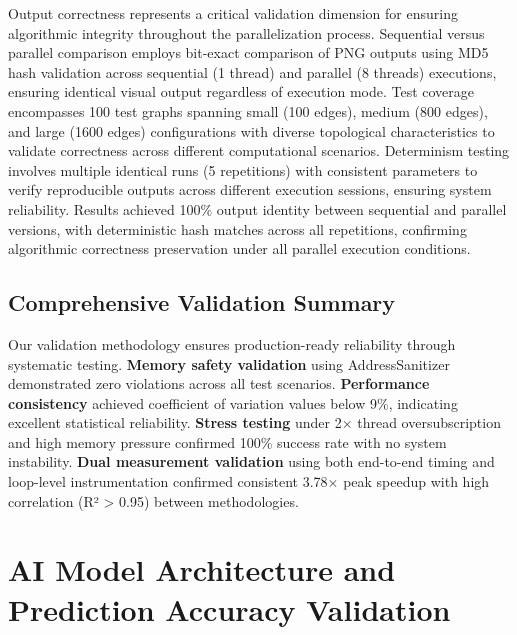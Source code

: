Output correctness represents a critical validation dimension for ensuring algorithmic integrity throughout the parallelization process. Sequential versus parallel comparison employs bit-exact comparison of PNG outputs using MD5 hash validation across sequential (1 thread) and parallel (8 threads) executions, ensuring identical visual output regardless of execution mode. Test coverage encompasses 100 test graphs spanning small (100 edges), medium (800 edges), and large (1600 edges) configurations with diverse topological characteristics to validate correctness across different computational scenarios. Determinism testing involves multiple identical runs (5 repetitions) with consistent parameters to verify reproducible outputs across different execution sessions, ensuring system reliability. Results achieved 100\% output identity between sequential and parallel versions, with deterministic hash matches across all repetitions, confirming algorithmic correctness preservation under all parallel execution conditions.

\subsection{Comprehensive Validation Summary}

Our validation methodology ensures production-ready reliability through systematic testing. \textbf{Memory safety validation} using AddressSanitizer demonstrated zero violations across all test scenarios. \textbf{Performance consistency} achieved coefficient of variation values below 9\%, indicating excellent statistical reliability. \textbf{Stress testing} under 2× thread oversubscription and high memory pressure confirmed 100\% success rate with no system instability. \textbf{Dual measurement validation} using both end-to-end timing and loop-level instrumentation confirmed consistent 3.78× peak speedup with high correlation (R² > 0.95) between methodologies.

\section{AI Model Architecture and Prediction Accuracy Validation}
\label{appendix:ai_model_validation}

